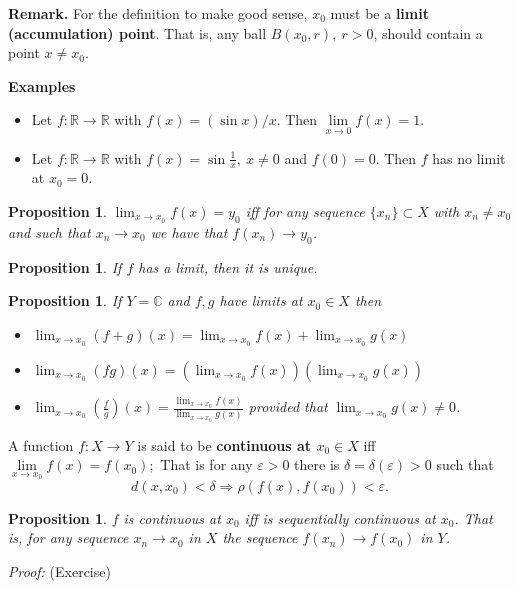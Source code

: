 \documentclass[12pt]{report}
\newtheorem{prop}[theorem]{Proposition}
\begin{document}
\bigskip
\noindent
\textbf{Remark.}  For the definition to make good sense, $x_0$ must
be a
\textbf{limit (accumulation) point}.   That is, any ball $B(x_0, r), \ r >
0$, should contain a point
$x \ne x_0$.

\bigskip
\noindent
\textbf{Examples} 
\begin{itemize}
\item[1. ] Let $f: \mathbb{R} \longrightarrow \mathbb{R}$ with
$f(x) = (\sin x)/x$.  Then $\lim\limits_{x \to 0} f(x) = 1$.
\item[2. ] Let $f: \mathbb{R} \longrightarrow \mathbb{R}$ with $f(x) =
\sin
\frac{1}{x}, \ x \ne 0$ and $f(0) = 0$.  Then $f$ has no limit at $x_0=0$.
\end{itemize}

\begin{prop}
\label{pr:seq-cont0}
  $\displaystyle{\lim_{x \to x_0} f(x) = y_0}$
iff for any sequence
$\{x_n\} \subset X$ with $x_n \ne x_0$ and such that $x_n \to x_0$ we
have that
$f(x_n) \longrightarrow y_0$.
\end{prop}

\begin{prop}
\label{pr:uniq-lim}  If $f$ has a limit, then it is unique.
\end{prop}

\begin{prop}
\label{pr:alg}  If $Y =\mathbb{C}$ and $f, g$ have
limits at $x_0 \in X$ then
\begin{itemize}
\item[1.]  $\displaystyle{\lim_{x \to x_0} (f + g)(x) = \lim_{x \to
x_0} f(x) +
\lim_{x \to x_0} g (x)}$
\item[2.]  $\displaystyle{\lim_{x \to x_0} (fg)(x) = \left ( \lim_{x \to
x_0} f(x)
\right ) \left ( \lim_{x \to x_0} g(x) \right )}$
\item[3.]  $\displaystyle{\lim_{x \to x_0} \left ( \frac{f}{g} \right )
(x) = \frac{\lim_{x \to x_0} f(x)}{\lim_{x \to x_0} g(x)}}$
provided that $\lim_{x \to x_0} g (x) \ne 0$.
\end{itemize}
\end{prop}
A function $f: X \longrightarrow Y$ is said to be
{\textbf{continuous at
$x_0
\in X$}} iff  $\lim\limits_{x\to x_0} f(x) = f(x_0);$ That is for any
$\varepsilon > 0$ there is
$\delta = \delta (\varepsilon) > 0$ such that
\[ d(x, x_0) < \delta \Longrightarrow \rho(f(x), f(x_0)) < \varepsilon.
\]
\begin{prop}
\label{pr:seq-cont1}
 $f$ is continuous at $x_0$ iff is
sequentially continuous at
$x_0$. That is,  for any sequence $x_n \longrightarrow x_0$ in $X$ the
sequence
$f(x_n)
\longrightarrow f(x_0)$ in $Y$.
\end{prop}
\textit{Proof:} (Exercise)
\end{document}
